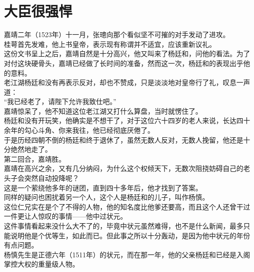 \section{大臣很强悍}
\ifnum{}
	\begin{multicols}{\theparacolNo}
\fi
嘉靖二年（1523年）十一月，张璁向那个看似坚不可摧的对手发动了进攻。\\

桂萼首先发难，他上书皇帝，表示现有称谓并不适宜，应该重新议礼。\\

这份文书呈上之后，嘉靖自然是十分高兴，他又叫来了杨廷和，问他的看法。为了对付这块硬骨头，嘉靖已经做了长时间的准备，然而这一次，杨廷和的表现出乎他的意料。\\

老江湖杨廷和没有再表示反对，却也不赞成，只是淡淡地对皇帝行了礼，叹息一声道：\\

“我已经老了，请陛下允许我致仕吧。”\\

嘉靖惊呆了，他不知道这位老江湖又打什么算盘，当时就愣住了。\\

杨廷和没有开玩笑，他确实是不想干了，对于这位六十四岁的老人来说，长达四十余年的勾心斗角、你来我往，他已经彻底厌倦了。\\

于是历经四朝不倒的杨廷和终于退休了，虽然无数人反对，无数人挽留，他还是十分绝然地走了。\\

第二回合，嘉靖胜。\\

嘉靖在高兴之余，又有几分纳闷，为什么这个权倾天下，无数次阻挠妨碍自己的老头子会突然自动投降呢？\\

这是一个萦绕他多年的谜团，直到四十多年后，他才找到了答案。\\

同样的疑问也困扰着另一个人，这个人是杨廷和的儿子，叫作杨慎。\\

这位仁兄实在是个了不得的人物，他的知名度比他爹还要高，而且这个人还曾干过一件更让人惊叹的事情——他中过状元。\\

这件事情看起来没什么大不了的，毕竟中状元虽然难得，也不是什么新闻，最多只能说明他是个优等生，如此而已。但此事之所以十分轰动，是因为他中状元的年份有点问题。\\

杨慎先生是正德六年（1511年）的状元，而在那一年，他的父亲杨廷和已经是入阁掌控大权的重量级人物。\\


\end{multicols}
